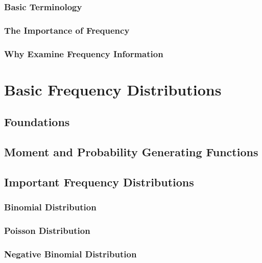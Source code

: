 \documentclass[]{book}
\begin{document}
\subsubsection{Basic Terminology}\label{S:basic-terminology}

\subsubsection{The Importance of
Frequency}\label{S:the-importance-of-frequency}

\subsubsection{Why Examine Frequency
Information}\label{S:why-examine-frequency-information}

\section{Basic Frequency
Distributions}\label{S:basic-frequency-distributions}

\subsection{Foundations}\label{S:foundations}

\subsection{Moment and Probability Generating
Functions}\label{S:generating-functions}

\subsection{Important Frequency
Distributions}\label{S:important-frequency-distributions}

\subsubsection{Binomial Distribution}\label{S:binomial-distribution}

\subsubsection{Poisson Distribution}\label{S:poisson-distribution}

\subsubsection{Negative Binomial
Distribution}\label{S:negative-binomial-distribution}
\end{document}
